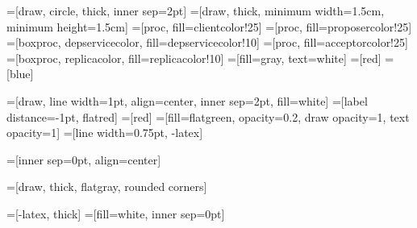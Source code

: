 =[draw, circle, thick, inner sep=2pt]
=[draw, thick, minimum width=1.5cm, minimum height=1.5cm]
=[proc, fill=clientcolor!25]
=[proc, fill=proposercolor!25]
=[boxproc, depservicecolor, fill=depservicecolor!10]
=[proc, fill=acceptorcolor!25]
=[boxproc, replicacolor, fill=replicacolor!10]
=[fill=gray, text=white]
=[red]
=[blue]

=[draw, line width=1pt, align=center, inner sep=2pt, fill=white]
=[label distance=-1pt, flatred]
=[red]
=[fill=flatgreen, opacity=0.2, draw opacity=1,
                      text opacity=1]
=[line width=0.75pt, -latex]

=[inner sep=0pt, align=center]

=[draw, thick, flatgray, rounded corners]

=[-latex, thick]
=[fill=white, inner sep=0pt]

